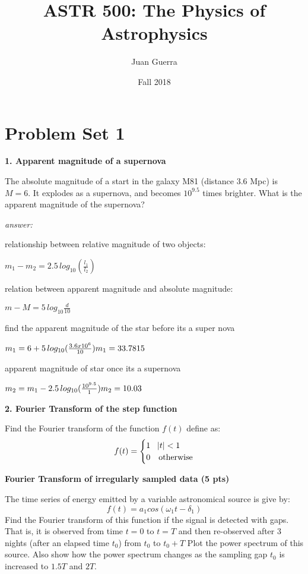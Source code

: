 \documentclass{article}
\title{ASTR 500: The Physics of Astrophysics}
\author{Juan Guerra}
\date{Fall 2018}
\begin{document}
\maketitle

\section{Problem Set 1}
	
	\textbf{1. Apparent magnitude of a supernova}
	
    	The absolute magnitude of a start in the galaxy M81 (distance 3.6 Mpc) is $M=6.$ It explodes as a supernova, and becomes $10^{9.5}$ times brighter. What is the apparent magnitude of the supernova?
	
    \textit{answer:}
    
        relationship between relative magnitude of two objects:
        
        $m_{1}-m_{2}=2.5 \, log_{10}(\frac{l_{1}}{l_{2}})$
        
        relation between apparent magnitude and absolute magnitude:
        
        $m-M = 5\, log_{10}\frac{d}{10}$
        
        find the apparent magnitude of the star before its a super nova
        
        $m_{1}=6+5\,log_{10}(\frac{3.6 x 10^{6}}{10})\hfill m_{1}=33.7815$
        
        apparent magnitude of star once its  a supernova
       
        $m_{2}= m_{1}-\textbf{} 2.5\, log_{10}(\frac{10^{9.5}}{1})\hfill \textbf{}m_{2}= 10.03$
	
	
	\textbf{2. Fourier Transform of the step function}

		Find the Fourier transform  of the function $f(t)$ define as:
		\begin{equation}
		  f(t) =
		  \begin{cases}
		   1 & \abs{t} <1 \\
		   0 & \text{otherwise} \\
		  \end{cases}
		\end{equation}
	

	
		\textbf{Fourier Transform of irregularly sampled data (5 pts)}
		
		The time series of energy emitted by a variable astronomical source is give by:
		\begin{equation}
			f(t)=a_{1}cos(\omega_{1}t -\delta_{1})
		\end{equation}
		Find the Fourier transform of this function if the signal is detected with gaps. That is, it is observed from time $t=0$ to $t=T$ and then re-observed after 3 nights (after an elapsed time $t_{0}$) from $t_{0}$ to $t_{0}+T$ Plot the power spectrum of this source. Also show how the power spectrum changes as the sampling gap $t_{0}$ is increased to $1.5T$ and $2T.$
\end{document}
